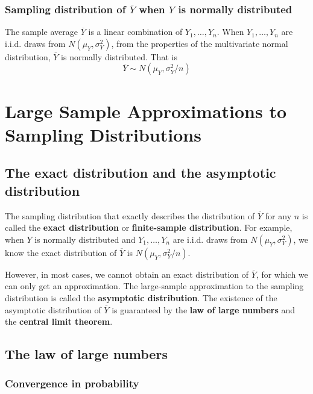 \documentclass[a4paper,11pt]{article}
\begin{document}
\subsubsection*{Sampling distribution of \(\overline{Y}\) when \(Y\) is normally distributed}
\label{sec:org7f22cf6}

The sample average \(\overline{Y}\) is a linear combination of \(Y_1,
\ldots, Y_n\). When \(Y_1, \ldots, Y_n\) are i.i.d. draws from \(N(\mu_Y,
\sigma^2_Y)\), from the properties of the multivariate normal
distribution, \(\overline{Y}\) is normally distributed. That is 
\[ \overline{Y} \sim N(\mu_Y, \sigma^2_Y/n) \]


\section{Large Sample Approximations to Sampling Distributions}
\label{sec:orge6ec036}

\subsection{The exact distribution and the asymptotic distribution}
\label{sec:org2984769}

The sampling distribution that exactly describes the distribution of
\(\overline{Y}\) for any \(n\) is called the \textbf{exact distribution} or
\textbf{finite-sample distribution}. For example, when \(Y\) is normally
distributed and \(Y_1, \ldots, Y_n\) are i.i.d. draws from \(N(\mu_Y,
\sigma^2_Y)\), we know the exact distribution of \(\overline{Y}\) is
\(N(\mu_Y, \sigma^2_Y/n)\). 

However, in most cases, we cannot obtain an exact distribution of
\(\overline{Y}\), for which we can only get an approximation. The
large-sample approximation to the sampling distribution is called the
\textbf{asymptotic distribution}. The existence of the asymptotic
distribution of \(\overline{Y}\) is guaranteed by the \textbf{law of large
numbers} and the \textbf{central limit theorem}. 


\subsection{The law of large numbers}
\label{sec:org974df6d}

\subsubsection*{Convergence in probability}
\label{sec:orge7237fb}
\end{document}
